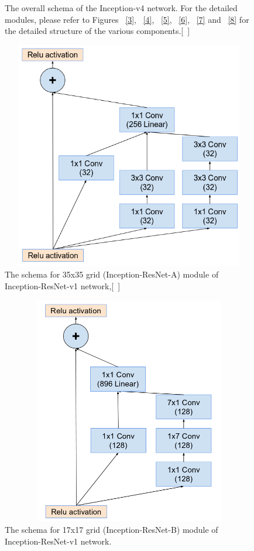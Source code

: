\documentclass[a4paper,12pt, twoside]{NITKReport}
\begin{document}
\begin{figure}
\begin{minipage}[b]{0.4\textwidth}
    \caption{The overall schema of the Inception-v4 network. For the
detailed modules, please refer to Figures ~\ref{3}, ~\ref{4}, ~\ref{5}, ~\ref{6}, ~\ref{7} and ~\ref{8} for the detailed structure of the various components.[~\cite{szegedy2017inception}]}
    \label{9}
  \end{minipage}
\end{figure}


\begin{figure}[h]
  \centering
    \includegraphics[height=10cm,width=13cm]{figure10.png}
\caption{The  schema  for 35x35 grid  (Inception-ResNet-A) module of Inception-ResNet-v1 network,[~\cite{szegedy2017inception}]}
\label{10}
\end{figure}

\begin{figure}[h]
  \centering
    \includegraphics[height=10cm,width=13cm]{figure11.png}
    \caption{The  schema  for 17x17 grid  (Inception-ResNet-B) module of Inception-ResNet-v1 network.}
    \label{11}
 
\end{figure}
\end{document}
